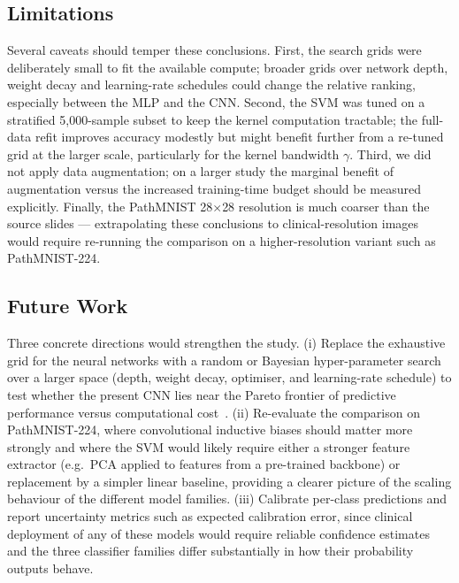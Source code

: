 \documentclass[../main.tex]{subfiles}
\begin{document}
\subsection{Limitations}
\noindent
Several caveats should temper these conclusions. First, the search grids
were deliberately small to fit the available compute; broader grids over
network depth, weight decay and learning-rate schedules could change the
relative ranking, especially between the \gls{MLP} and the \gls{CNN}.
Second, the SVM was tuned on a stratified 5{,}000-sample subset to keep
the kernel computation tractable; the full-data refit improves accuracy
modestly but might benefit further from a re-tuned grid at the larger
scale, particularly for the kernel bandwidth $\gamma$. Third, we did not
apply data augmentation; on a larger study the marginal benefit of
augmentation versus the increased training-time budget should be measured
explicitly. Finally, the PathMNIST 28$\times$28 resolution is much
coarser than the source slides — extrapolating these conclusions to
clinical-resolution images would require re-running the comparison on a
higher-resolution variant such as PathMNIST-224.

\subsection{Future Work}
\noindent
Three concrete directions would strengthen the study. (i) Replace the
exhaustive grid for the neural networks with a random or Bayesian
hyper-parameter search over a larger space (depth, weight decay,
optimiser, and learning-rate schedule) to test whether the present
\gls{CNN} lies near the Pareto frontier of predictive performance versus
computational cost~\cite{bergstra2012random}. (ii) Re-evaluate the
comparison on PathMNIST-224, where convolutional inductive biases should
matter more strongly and where the \gls{SVM} would likely require either
a stronger feature extractor (e.g.~\gls{PCA} applied to features from a
pre-trained backbone) or replacement by a simpler linear baseline,
providing a clearer picture of the scaling behaviour of the different
model families. (iii) Calibrate per-class predictions and report
uncertainty metrics such as expected calibration error, since clinical
deployment of any of these models would require reliable confidence
estimates and the three classifier families differ substantially in how
their probability outputs behave.
\end{document}

